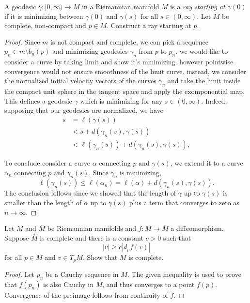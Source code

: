 \documentclass{book}
\begin{document}
\begin{exercise}
\label{exercise-ray}
A geodesic $\gamma:[0,\infty) \to M$
in a Riemannian manifold $M$ is a {\it ray
starting at $\gamma(0)$}
if it is minimizing between $\gamma(0)$ and
$\gamma(s)$
for all $s \in (0,\infty)$.
Let $M$ be complete, non-compact and $p \in
M$.
Construct a ray starting at $p$.
\end{exercise}

\begin{proof}
Since $m$ is not compact and complete,
we can pick a sequence $p_n \in m\setminus
\bar{b}_n(p)$
and minimizing geodesics $\gamma_n$ from $p$
to $p_n$.
we would like to consider a curve by taking
limit
and show it's minimizing.
however pointwise convergence would not
ensure smoothness of the limit curve.
instead, we consider the normalized initial
velocity vectors
of the curves $\gamma_n$ and take the limit
inside
the compact unit sphere in the tangent space
and apply the exomponential map.
This defines a geodesic $\gamma$ which
is minimizing for any $s \in (0,\infty)$.
Indeed, supposing that our geodesics
are normalized, we have
$$
\begin{aligned}
s &= \ell(\gamma(s))\\
&< s + d(\gamma_n(s),\gamma(s))\\
&< \ell(\gamma_n(s)) +
d(\gamma_n(s),\gamma(s)),
\end{aligned}
$$

\noindent
To conclude consider a curve $\alpha$
connecting $p$ and $\gamma(s)$,
we extend it to a curve $\alpha_n$ connecting
$p$ and $\gamma_n(s)$.
Since $\gamma_n$ is minimizing,
$$
\ell(\gamma_n(s))\leq \ell(\alpha_n)
=\ell(\alpha)+d(\gamma_n(s),\gamma(s)).
$$
The conclusion follows since we showed that
the
length of $\gamma$ up to $\gamma(s)$
is smaller than the length of $\alpha$ up to
$\gamma(s)$
plus a term that converges to zero as $n\to
\infty$.
\end{proof}

\begin{exercise}
\label{exercise-contraction-and-completeness}
Let $M$ and $\overline{M}$ be Riemannian
manifolds
and $f:M \to \overline{M}$ a diffeomorphism.
Suppose $\overline{M}$ is complete and there
is a constant $c>0$
such that
$$
|v|\geq c|d_pf(v)|
$$
for all $p \in M$ and $v \in T_pM$.
Show that $M$ is complete.
\end{exercise}

\begin{proof}
Let $p_n$ be a Cauchy sequence in $M$.
The given inequality is used to prove
that $f(p_n)$ is also Cauchy in
$\overline{M}$,
and thus converges to a point $f(p)$.
Convergence of the preimage follows from
continuity of $f$.
\end{proof}
\end{document}
